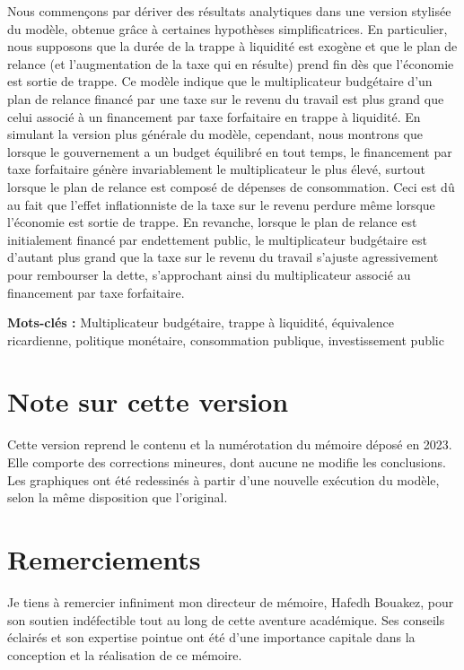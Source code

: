 \documentclass[12pt,letterpaper]{article}
\begin{document}
Nous commençons par dériver des résultats analytiques dans une version stylisée du modèle, obtenue grâce à certaines hypothèses simplificatrices. En particulier, nous supposons que la durée de la trappe à liquidité est exogène et que le plan de relance (et l’augmentation de la taxe qui en résulte) prend fin dès que l’économie est sortie de trappe. Ce modèle indique que le multiplicateur budgétaire d’un plan de relance financé par une taxe sur le revenu du travail est plus grand que celui associé à un financement par taxe forfaitaire en trappe à liquidité. En simulant la version plus générale du modèle, cependant, nous montrons que lorsque le gouvernement a un budget équilibré en tout temps, le financement par taxe forfaitaire génère invariablement le multiplicateur le plus élevé, surtout lorsque le plan de relance est composé de dépenses de consommation. Ceci est dû au fait que l’effet inflationniste de la taxe sur le revenu perdure même lorsque l’économie est sortie de trappe. En revanche, lorsque le plan de relance est initialement financé par endettement public, le multiplicateur budgétaire est d’autant plus grand que la taxe sur le revenu du travail s’ajuste agressivement pour rembourser la dette, s’approchant ainsi du multiplicateur associé au financement par taxe forfaitaire.

\medskip
\noindent\textbf{Mots-clés :} Multiplicateur budgétaire, trappe à liquidité, équivalence ricardienne, politique monétaire, consommation publique, investissement public

\newpage
\tableofcontents
\newpage
\listoftables
\listoffigures

\section*{Note sur cette version}

Cette version reprend le contenu et la numérotation du mémoire déposé en 2023. Elle comporte des corrections mineures, dont aucune ne modifie les conclusions. Les graphiques ont été redessinés à partir d’une nouvelle exécution du modèle, selon la même disposition que l’original.

\section*{Remerciements}

Je tiens à remercier infiniment mon directeur de mémoire, Hafedh Bouakez, pour son soutien indéfectible tout au long de cette aventure académique. Ses conseils éclairés et son expertise pointue ont été d'une importance capitale dans la conception et la réalisation de ce mémoire.
\end{document}
